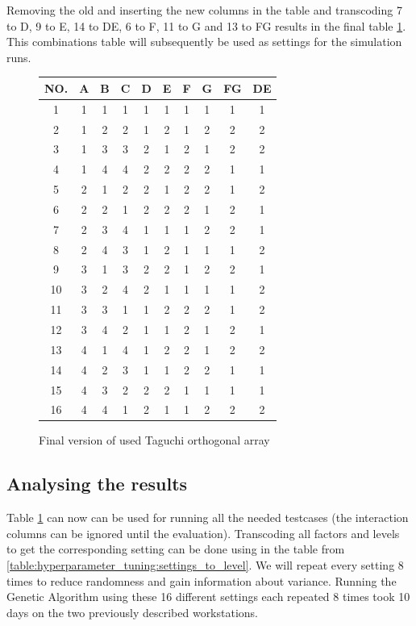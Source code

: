 Removing the old and inserting the new columns in the table and transcoding 7 to D, 9 to E, 14 to DE, 6 to F, 11 to G and 13 to FG results in the final table \ref{table:hyperparameter_tuning:final_taguchi}.
This combinations table will subsequently be used as settings for the simulation runs.

\begin{figure}[ht]
	\centering
	\begin{tabular}{ |c||c|c|c|c|c|c|c|c|c|  }
		\hline
		NO.& A & B & C & D & E & F & G & FG& DE\\
		\hline
		1  & 1 & 1 & 1 & 1 & 1 & 1 & 1 & 1 & 1\\
		2  & 1 & 2 & 2 & 1 & 2 & 1 & 2 & 2 & 2\\
		3  & 1 & 3 & 3 & 2 & 1 & 2 & 1 & 2 & 2\\
		4  & 1 & 4 & 4 & 2 & 2 & 2 & 2 & 1 & 1\\
		5  & 2 & 1 & 2 & 2 & 1 & 2 & 2 & 1 & 2\\
		6  & 2 & 2 & 1 & 2 & 2 & 2 & 1 & 2 & 1\\
		7  & 2 & 3 & 4 & 1 & 1 & 1 & 2 & 2 & 1\\
		8  & 2 & 4 & 3 & 1 & 2 & 1 & 1 & 1 & 2\\
		9  & 3 & 1 & 3 & 2 & 2 & 1 & 2 & 2 & 1\\
		10 & 3 & 2 & 4 & 2 & 1 & 1 & 1 & 1 & 2\\
		11 & 3 & 3 & 1 & 1 & 2 & 2 & 2 & 1 & 2\\
		12 & 3 & 4 & 2 & 1 & 1 & 2 & 1 & 2 & 1\\
		13 & 4 & 1 & 4 & 1 & 2 & 2 & 1 & 2 & 2\\
		14 & 4 & 2 & 3 & 1 & 1 & 2 & 2 & 1 & 1\\
		15 & 4 & 3 & 2 & 2 & 2 & 1 & 1 & 1 & 1\\
		16 & 4 & 4 & 1 & 2 & 1 & 1 & 2 & 2 & 2\\
		\hline
	\end{tabular}
	\caption{Final version of used Taguchi orthogonal array}
	\label{table:hyperparameter_tuning:final_taguchi}
\end{figure}


\subsection{Analysing the results}
\label{chap:hyperparameter_tuning:analysis_of_results}
Table \ref{table:hyperparameter_tuning:final_taguchi} can now can be used for running all the needed testcases (the interaction columns can be ignored until the evaluation). Transcoding all factors and levels to get the corresponding setting can be done using in the table from \ref{table:hyperparameter_tuning:settings_to_level}. We will repeat every setting 8 times to reduce randomness and gain information about variance. 
Running the Genetic Algorithm using these 16 different settings each repeated 8 times took 10 days on the two previously described workstations.

